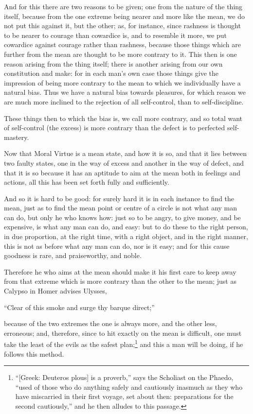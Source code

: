 And for this there are two reasons to be given; one from the nature of the
thing itself, because from the one extreme being nearer and more like the mean,
we do not put this against it, but the other; as, for instance, since rashness
is thought to be nearer to courage than cowardice is, and to resemble it more,
we put cowardice against courage rather than rashness, because those things
which are further from the mean are thought to be more contrary to it. This
then is one reason arising from the thing itself; there is another arising from
our own constitution and make: for in each man’s own case those things
give the impression of being more contrary to the mean to which we individually
have a natural bias. Thus we have a natural bias towards pleasures, for which
reason we are much more inclined to the rejection of all self-control, than to
self-discipline.

These things then to which the bias is, we call more contrary, and so total
want of self-control (the excess) is more contrary than the defect is to
perfected self-mastery.


Now that Moral Virtue is a mean state, and how it is so, and that it lies
between two faulty states, one in the way of excess and another in the way of
defect, and that it is so because it has an aptitude to aim at the mean both in
feelings and actions, all this has been set forth fully and sufficiently.

And so it is hard to be good: for surely hard it is in each instance to find
the mean, just as to find the mean point or centre of a circle is not what any
man can do, but only he who knows how: just so to be angry, to give money, and
be expensive, is what any man can do, and easy: but to do these to the right
person, in due proportion, at the right time, with a right object, and in the
right manner, this is not as before what any man can do, nor is it easy; and
for this cause goodness is rare, and praiseworthy, and noble.

Therefore he who aims at the mean should make it his first care to keep away
from that extreme which is more contrary than the other to the mean; just as
Calypso in Homer advises Ulysses,

“Clear of this smoke and surge thy barque direct;”

because of the two extremes the one is always more, and the other less,
erroneous; and, therefore, since to hit exactly on the mean is difficult, one
must take the least of the evils as the safest plan;\footnote{“[Greek: Deuteros plous] is a proverb,” says the Scholiast on the
Phaedo, “used of those who do anything safely and cautiously inasmuch as
they who have miscarried in their first voyage, set about then: preparations
for the second cautiously,” and he then alludes to this passage.}
and this a man will be doing, if he follows this method.

